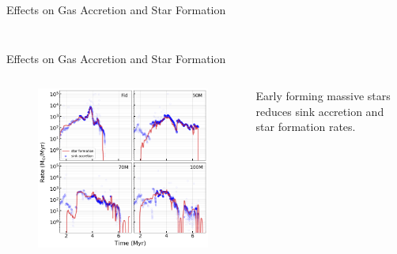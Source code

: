 \documentclass[aspectratio=169]{beamer}
\begin{document}
\begin{frame}{Effects on Gas Accretion and Star Formation}{}
\begin{columns}
\begin{column}{0.45\textwidth}
\begin{figure}[h!]
                \label{fig:cum_mass}
            \end{figure}
        \end{column}
    \end{columns}
\end{frame} 

\begin{frame}{Effects on Gas Accretion and Star Formation}{}
    \begin{columns}
        \begin{column}{0.42\textwidth}
            \begin{figure}[h!]
                \centering
                \includegraphics[width=\linewidth]{../images/sink_accretion_star_formation_rates.png} \\
                \label{fig:sink_star_rates}
            \end{figure}
        \end{column}
        \begin{column}{0.42\textwidth}
            Early forming massive stars reduces sink accretion and star formation rates.
\end{column}
\end{columns}
\end{frame}
\end{document}
